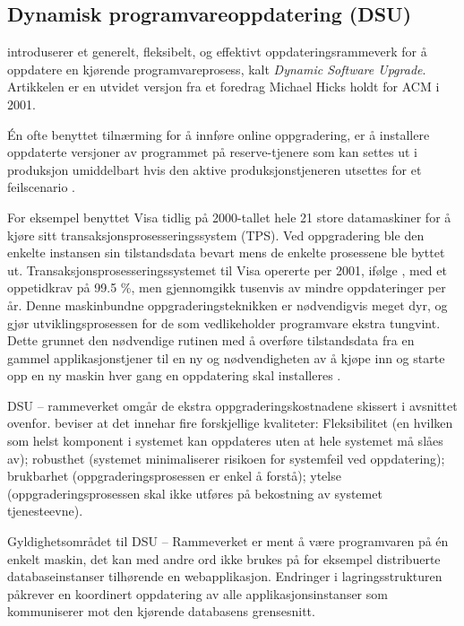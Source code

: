 \subsection{Dynamisk programvareoppdatering (DSU)}

\cite{hicks2005dsu} introduserer et generelt, fleksibelt, og effektivt oppdateringsrammeverk for å oppdatere en kjørende programvareprosess, kalt \emph{Dynamic Software Upgrade}. Artikkelen er en utvidet versjon fra et foredrag Michael Hicks holdt for ACM i 2001.

Én ofte benyttet tilnærming for å innføre online oppgradering, er å installere oppdaterte versjoner av programmet på reserve-tjenere som kan settes ut i produksjon umiddelbart hvis den aktive produksjonstjeneren utsettes for et feilscenario \citep{hicks2005dsu}. %

For eksempel benyttet Visa tidlig på 2000-tallet hele 21 store datamaskiner for å kjøre sitt transaksjonsprosesseringssystem (TPS). Ved oppgradering ble den enkelte instansen sin tilstandsdata bevart mens de enkelte prosessene ble byttet ut. Transaksjonsprosesseringssystemet til Visa opererte per 2001, ifølge \cite{hicks2005dsu}, med et oppetidkrav på 99.5 \%, men gjennomgikk tusenvis av mindre oppdateringer per år. Denne maskinbundne oppgraderingsteknikken er nødvendigvis meget dyr, og gjør utviklingsprosessen for de som vedlikeholder programvare ekstra tungvint. Dette grunnet den nødvendige rutinen med å overføre tilstandsdata fra en gammel applikasjonstjener til en ny og nødvendigheten av å kjøpe inn og starte opp en ny maskin hver gang en oppdatering skal installeres \citep{hicks2005dsu}.

DSU – rammeverket omgår de ekstra oppgraderingskostnadene skissert i avsnittet ovenfor. \cite{hicks2005dsu} beviser at det innehar fire forskjellige kvaliteter: Fleksibilitet (en hvilken som helst komponent i systemet kan oppdateres uten at hele systemet må slåes av); robusthet (systemet minimaliserer risikoen for systemfeil ved oppdatering); brukbarhet (oppgraderingsprosessen er enkel å forstå); ytelse (oppgraderingsprosessen skal ikke utføres på bekostning av systemet tjenesteevne).

Gyldighetsområdet til DSU – Rammeverket er ment å være programvaren på én enkelt maskin, det kan med andre ord ikke brukes på for eksempel distribuerte databaseinstanser tilhørende en webapplikasjon. Endringer i lagringsstrukturen påkrever en koordinert oppdatering av alle applikasjonsinstanser som kommuniserer mot den kjørende databasens grensesnitt.

